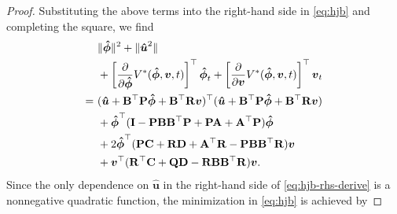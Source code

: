 \documentclass[journal,twoside,web]{ieeecolor}
\newcommand{\state}{\phi}
\newcommand{\statehat}{\hat{\state}}
\begin{document}
\begin{proof}
Substituting the above terms into the right-hand side in \eqref{eq:hjb} and completing the square, we find
\begin{equation}\label{eq:hjb-rhs-derive}
	\begin{aligned}
		&\|\boldsymbol{\statehat}\|^2+\|\boldsymbol{\hat{u}}^2\| \\
		&+ \left[\pdv{}{\boldsymbol{\statehat}}V^*(\boldsymbol{\statehat},\boldsymbol{v},t)\right]^\top \boldsymbol{\statehat}_t + \left[\pdv{}{\boldsymbol{v}}V^*(\boldsymbol{\statehat},\boldsymbol{v},t)\right]^\top \boldsymbol{v}_t \\
		=\
		&(\boldsymbol{\hat{u}} + \mathbf{B}^\top \mathbf{P}\boldsymbol{\statehat} + \mathbf{B}^\top\mathbf{R}\boldsymbol{v})^\top(\boldsymbol{\hat{u}} + \mathbf{B}^\top \mathbf{P}\boldsymbol{\statehat} + \mathbf{B}^\top\mathbf{R}\boldsymbol{v}) \\ 
		&+ \boldsymbol{\statehat}^\top(\mathbf{I - PBB^\top P + PA + A^\top P})\boldsymbol{\statehat} \\ 
		&+2\boldsymbol{\statehat}^\top(\mathbf{PC + RD + A^\top R - PBB^\top R} )\boldsymbol{v}\\
		& + \boldsymbol{v}^\top(\mathbf{R^\top C + QD - RBB^\top R})\boldsymbol{v}.
	\end{aligned}
\end{equation}
Since the only dependence on $\boldsymbol{\hat{u}}$ in the right-hand side of \eqref{eq:hjb-rhs-derive} is a nonnegative quadratic function, the minimization in \eqref{eq:hjb} is achieved by 

\end{proof}
\end{document}

